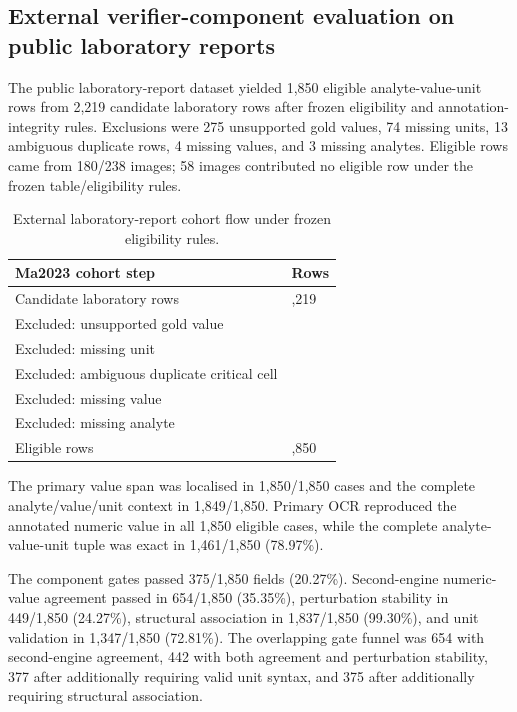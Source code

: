 \documentclass[10pt]{article}
\begin{document}
\subsection{External verifier-component evaluation on public laboratory reports}

The public laboratory-report dataset yielded 1,850 eligible analyte-value-unit rows from 2,219 candidate laboratory rows after frozen eligibility and annotation-integrity rules. Exclusions were 275 unsupported gold values, 74 missing units, 13 ambiguous duplicate rows, 4 missing values, and 3 missing analytes. Eligible rows came from 180/238 images; 58 images contributed no eligible row under the frozen table/eligibility rules.

\begin{table}[t]
\centering\small
\caption{External laboratory-report cohort flow under frozen eligibility rules.}
\label{tab:cohort}
\begin{tabularx}{\textwidth}{>{\raggedright\arraybackslash}X>{\raggedright\arraybackslash}X}
\toprule
Ma2023 cohort step & Rows \\
\midrule
Candidate laboratory rows & 2,219 \\
Excluded: unsupported gold value & 275 \\
Excluded: missing unit & 74 \\
Excluded: ambiguous duplicate critical cell & 13 \\
Excluded: missing value & 4 \\
Excluded: missing analyte & 3 \\
Eligible rows & 1,850 \\
\bottomrule
\end{tabularx}
\end{table}

The primary value span was localised in 1,850/1,850 cases and the complete analyte/value/unit context in 1,849/1,850. Primary OCR reproduced the annotated numeric value in all 1,850 eligible cases, while the complete analyte-value-unit tuple was exact in 1,461/1,850 (78.97\%).

The component gates passed 375/1,850 fields (20.27\%). Second-engine numeric-value agreement passed in 654/1,850 (35.35\%), perturbation stability in 449/1,850 (24.27\%), structural association in 1,837/1,850 (99.30\%), and unit validation in 1,347/1,850 (72.81\%). The overlapping gate funnel was 654 with second-engine agreement, 442 with both agreement and perturbation stability, 377 after additionally requiring valid unit syntax, and 375 after additionally requiring structural association.
\end{document}
